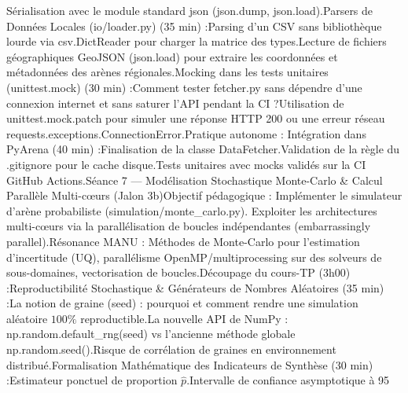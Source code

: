 Sérialisation avec le module standard json (json.dump, json.load).Parsers de Données Locales (io/loader.py) (35 min) :Parsing d'un CSV sans bibliothèque lourde via csv.DictReader pour charger la matrice des types.Lecture de fichiers géographiques GeoJSON (json.load) pour extraire les coordonnées et métadonnées des arènes régionales.Mocking dans les tests unitaires (unittest.mock) (30 min) :Comment tester fetcher.py sans dépendre d'une connexion internet et sans saturer l'API pendant la CI ?Utilisation de unittest.mock.patch pour simuler une réponse HTTP 200 ou une erreur réseau requests.exceptions.ConnectionError.Pratique autonome : Intégration dans PyArena (40 min) :Finalisation de la classe DataFetcher.Validation de la règle du .gitignore pour le cache disque.Tests unitaires avec mocks validés sur la CI GitHub Actions.Séance 7 — Modélisation Stochastique Monte-Carlo & Calcul Parallèle Multi-cœurs (Jalon 3b)Objectif pédagogique : Implémenter le simulateur d'arène probabiliste (simulation/monte_carlo.py). Exploiter les architectures multi-cœurs via la parallélisation de boucles indépendantes (embarrassingly parallel).Résonance MANU : Méthodes de Monte-Carlo pour l'estimation d'incertitude (UQ), parallélisme OpenMP/multiprocessing sur des solveurs de sous-domaines, vectorisation de boucles.Découpage du cours-TP (3h00) :Reproductibilité Stochastique & Générateurs de Nombres Aléatoires (35 min) :La notion de graine (seed) : pourquoi et comment rendre une simulation aléatoire $100\%$ reproductible.La nouvelle API de NumPy : np.random.default_rng(seed) vs l'ancienne méthode globale np.random.seed().Risque de corrélation de graines en environnement distribué.Formalisation Mathématique des Indicateurs de Synthèse (30 min) :Estimateur ponctuel de proportion $\hat{p}$.Intervalle de confiance asymptotique à 95 %